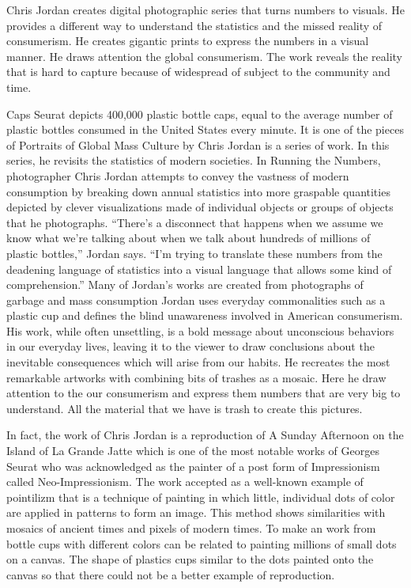 Chris Jordan creates digital photographic series that turns numbers to visuals. He provides a different way to understand the statistics and the missed reality of consumerism. He creates gigantic prints to express the numbers in a visual manner. He draws attention the global consumerism. The work reveals the reality that is hard to capture because of widespread of subject to the community and time.

Caps Seurat depicts 400,000 plastic bottle caps, equal to the average number of plastic bottles consumed in the United States every minute. It is one of the pieces of Portraits of Global Mass Culture by Chris Jordan is a series of work. In this series, he revisits the statistics of modern societies.  In Running the Numbers, photographer Chris Jordan attempts to convey the vastness of modern consumption by breaking down annual statistics into more graspable quantities depicted by clever visualizations made of individual objects or groups of objects that he photographs. “There’s a disconnect that happens when we assume we know what we’re talking about when we talk about hundreds of millions of plastic bottles,” Jordan says. “I’m trying to translate these numbers from the deadening language of statistics into a visual language that allows some kind of comprehension.” Many of Jordan's works are created from photographs of garbage and mass consumption Jordan uses everyday commonalities such as a plastic cup and defines the blind unawareness involved in American consumerism. His work, while often unsettling, is a bold message about unconscious behaviors in our everyday lives, leaving it to the viewer to draw conclusions about the inevitable consequences which will arise from our habits. He recreates the most remarkable artworks with combining bits of trashes as a mosaic. Here he draw attention to the our consumerism and express them numbers that are very big to understand. All the material that we have is trash to create this pictures.

In fact, the work of Chris Jordan is a reproduction of A Sunday Afternoon on the Island of La Grande Jatte which is one of the most notable works of Georges Seurat who was acknowledged as the painter of a post form of Impressionism called Neo-Impressionism. The work accepted as a well-known example of pointilizm that is a technique of painting in which little, individual dots of color are applied in patterns to form an image. This method shows similarities with mosaics of ancient times and pixels of modern times. To make an work from bottle cups with different colors can be related to painting millions of small dots on a canvas. The shape of plastics cups similar to the dots painted onto the canvas so that there could not be a better example of reproduction.

